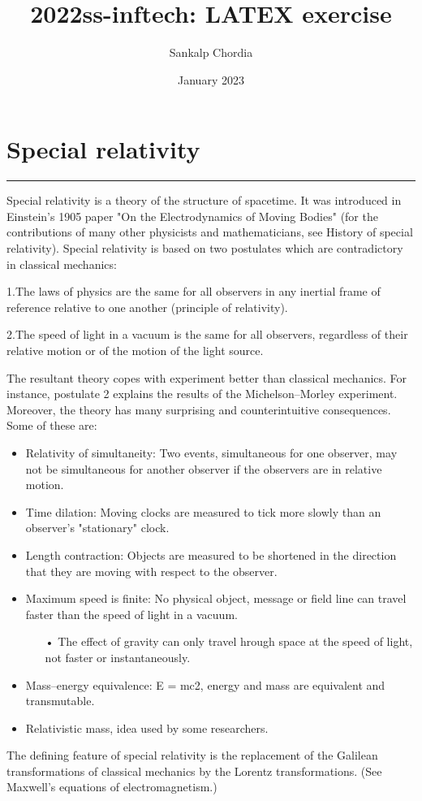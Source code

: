 \documentclass{article}
\title{2022ss-inftech: LATEX exercise}
\author{Sankalp Chordia}
\date{January 2023}
\begin{document}
\maketitle


\section{Special relativity}

\hrule
\vspace{5pt}


Special relativity is a theory of the structure of spacetime. It was introduced in Einstein's 1905 paper "On the Electrodynamics of Moving Bodies" (for the contributions of many other physicists and mathematicians, see History of special relativity). Special relativity is based on two postulates which are contradictory in classical mechanics:
\vspace{5pt}

1.The laws of physics are the same for all observers in any inertial frame of reference relative to one another (principle of relativity).
\vspace{3pt}

2.The speed of light in a vacuum is the same for all observers, regardless of their relative motion or of the motion of the light source.
\vspace{10pt}

The resultant theory copes with experiment better than classical mechanics. For instance, postulate 2 explains the results of the Michelson–Morley experiment. Moreover, the theory has many surprising and counterintuitive consequences. Some of these are:



   \begin{itemize}
     \item Relativity of simultaneity: Two events, simultaneous for one observer, may not be simultaneous for another observer if the observers are in relative motion.
     \item Time dilation: Moving clocks are measured to tick more slowly than an observer's "stationary" clock.
     \item Length contraction: Objects are measured to be shortened in the direction that they are moving with respect to the observer.
     \item Maximum speed is finite: No physical object, message or field line can travel faster than the speed of light in a vacuum.
      \begin{itemize}
      \item [•]The effect of gravity can only travel hrough space at the speed of light, not faster or instantaneously.
      \end{itemize}
    \item Mass–energy equivalence: E = mc2, energy and mass are equivalent and transmutable.
    \item Relativistic mass, idea used by some researchers.
    \end{itemize}
    The defining feature of special relativity is the replacement of the Galilean transformations of classical mechanics by the Lorentz transformations. (See Maxwell's equations of electromagnetism.)
    
\end{document}
